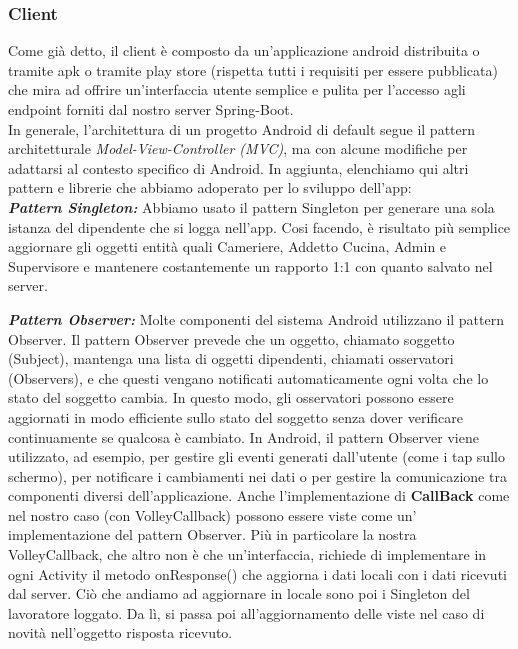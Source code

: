     \subsubsection{Client}
    \begin{flushleft}
        Come già detto, il client è composto da un'applicazione android distribuita o tramite apk o tramite play store (rispetta tutti i requisiti per essere pubblicata) che mira ad offrire un'interfaccia utente semplice e pulita 
        per l'accesso agli endpoint forniti dal nostro server Spring-Boot. \\
        In generale, l'architettura di un progetto Android di default segue il pattern architetturale \emph{Model-View-Controller (MVC)}, 
        ma con alcune modifiche per adattarsi al contesto specifico di Android. In aggiunta, elenchiamo qui altri pattern e librerie che abbiamo adoperato per lo sviluppo dell'app:\\
        \vspace{1cm}
        \textbf{\emph{Pattern Singleton:}} Abbiamo usato il pattern Singleton per generare una sola istanza del dipendente che si logga nell'app. 
        Cosi facendo, è risultato più semplice aggiornare gli oggetti entità quali Cameriere, Addetto Cucina, Admin e Supervisore e mantenere costantemente un rapporto 1:1 con quanto salvato nel server.\vspace{1cm}
        
        \textbf{\emph{Pattern Observer:}} Molte componenti del sistema Android utilizzano il pattern Observer. 
        Il pattern Observer prevede che un oggetto, chiamato soggetto (Subject), mantenga una lista di oggetti dipendenti, chiamati osservatori (Observers), 
        e che questi vengano notificati automaticamente ogni volta che lo stato del soggetto cambia. In questo modo, 
        gli osservatori possono essere aggiornati in modo efficiente sullo stato del soggetto senza dover verificare continuamente se qualcosa è cambiato.
        In Android, il pattern Observer viene utilizzato, ad esempio, per gestire gli eventi generati dall'utente (come i tap sullo schermo), per notificare i cambiamenti nei dati  o per gestire la comunicazione tra componenti diversi dell'applicazione.
        Anche l'implementazione di \textbf{CallBack} come nel nostro caso (con VolleyCallback) possono essere viste come un' implementazione del pattern Observer.
        Più in particolare la nostra VolleyCallback, che altro non è che un'interfaccia, richiede di implementare in ogni Activity il metodo onResponse() che aggiorna i dati locali con i dati ricevuti dal server.
        Ciò che andiamo ad aggiornare in locale sono poi i Singleton del lavoratore loggato. Da lì, si passa poi all'aggiornamento delle viste nel caso di novità nell'oggetto risposta ricevuto. \vspace{1cm}
       

\end{flushleft}
